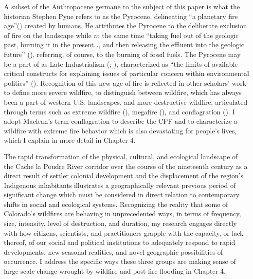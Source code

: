 \documentclass[
]{article}
\begin{document}
A subset of the Anthropocene germane to the subject of this paper is what the historian Stephen Pyne refers to as the Pyrocene, delineating ``a planetary fire age''() created by humans. He attributes the Pyrocene to the deliberate exclusion of fire on the landscape while at the same time ``taking fuel out of the geologic past, burning it in the present\ldots, and then releasing the effluent into the geologic future'' (), referring, of course, to the burning of fossil fuels. The Pyrocene may be a part of as Late Industrialism (; ), characterized as ``the limits of available critical constructs for explaining issues of particular concern within environmental politics'' (). Recognition of this new age of fire is reflected in other scholars' work to define more severe wildfire, to distinguish between wildfire, which has always been a part of western U.S. landscapes, and more destructive wildfire, articulated through terms such as extreme wildfire (), megafire (), and conflagration (). I adopt Maclean's term conflagration to describe the CPF and to characterize a wildfire with extreme fire behavior which is also devastating for people's lives, which I explain in more detail in Chapter 4.

The rapid transformation of the physical, cultural, and ecological landscape of the Cache la Poudre River corridor over the course of the nineteenth century as a direct result of settler colonial development and the displacement of the region's Indigenous inhabitants illustrates a geographically relevant previous period of significant change which must be considered in direct relation to contemporary shifts in social and ecological systems. Recognizing the reality that some of Colorado's wildfires are behaving in unprecedented ways, in terms of frequency, size, intensity, level of destruction, and duration, my research engages directly with how citizens, scientists, and practitioners grapple with the capacity, or lack thereof, of our social and political institutions to adequately respond to rapid developments, new seasonal realities, and novel geographic possibilities of occurrence. I address the specific ways these three groups are making sense of large-scale change wrought by wildfire and post-fire flooding in Chapter 4.
\end{document}
